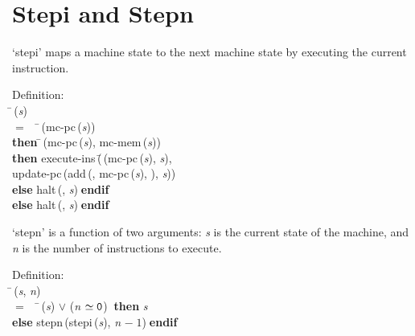  \newpage \section{Stepi and Stepn}
 `stepi' maps a machine state to the next machine state by executing
 the current instruction.
\begin{tabbing}{\sc Definition}: \\  
\=\,({\it{s\/}}) \\ 
$=$$\;\;\;\;$\=\,({\rm{mc-pc}}\,({\it{s\/}})) \\ 
{\bf then }\=\,({\rm{mc-pc}}\,({\it{s\/}}), {\rm{mc-mem}}\,({\it{s\/}})) \\ 
{\bf then }{\rm{execute-ins}}\,(\=\,({\rm{mc-pc}}\,({\it{s\/}}), {\it{s\/}}), \\ 
{\rm{update-pc}}\,({\rm{add}}\,({}, {\rm{mc-pc}}\,({\it{s\/}}), {}), {\it{s\/}}))\- \\ 
{\bf else }{\rm{halt}}\,({}, {\it{s\/}})$\;${\bf  endif}\- \\ 
{\bf else }{\rm{halt}}\,({}, {\it{s\/}})$\;${\bf  endif}\-\-
\end{tabbing}

 \label{stepn}`stepn' is a function of two arguments: {\it{s\/}} is the current state of the
 machine, and {\it{n\/}} is the number of instructions to execute.
\begin{tabbing}{\sc Definition}: \\  
\=\,({\it{s\/}}, {\it{n\/}}) \\ 
$=$$\;\;\;\;$\=\,({\it{s\/}}) $\vee$ ({\it{n\/}} $\simeq {\tt{0}}$)$\;\;${\bf then }{\it{s\/}} \\ 
{\bf else }{\rm{stepn}}\,({\rm{stepi}}\,({\it{s\/}}), {\it{n\/}} $-\;1$)$\;${\bf  endif}\-\-
\end{tabbing}

